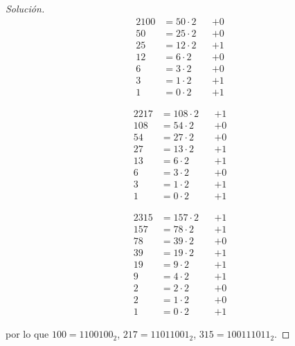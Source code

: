 \documentclass[spanish,mexico]{article}
\numberwithin{equation}{section}
\theoremstyle{definition}
\theoremstyle{remark}
\newenvironment{solution}{\begin{proof}[Solución]}{\end{proof}}
\begin{document}
\begin{enumerate}[wide]
\begin{solution}
    \begin{minipage}{.3\linewidth}
      \begin{alignat*}{2}
        100 &=50\cdot2&&+0\\
        50  &=25\cdot2&&+0\\
        25  &=12\cdot2&&+1\\
        12  &=6 \cdot2&&+0\\
        6   &=3 \cdot2&&+0\\
        3   &=1 \cdot2&&+1\\
        1   &=0 \cdot2&&+1
      \end{alignat*}
    \end{minipage}
    \begin{minipage}{.3\linewidth}
      \begin{alignat*}{2}
        217 &=108\cdot2&&+1\\
        108 &=54 \cdot2&&+0\\
        54  &=27 \cdot2&&+0\\
        27  &=13 \cdot2&&+1\\
        13  &=6  \cdot2&&+1\\
        6   &=3  \cdot2&&+0\\
        3   &=1  \cdot2&&+1\\
        1   &=0  \cdot2&&+1
      \end{alignat*}
    \end{minipage}
    \begin{minipage}{.3\linewidth}
      \begin{alignat*}{2}
        315 &=157 \cdot2&&+1\\
        157 &=78  \cdot2&&+1\\
        78  &=39  \cdot2&&+0\\
        39  &=19  \cdot2&&+1\\
        19  &=9   \cdot2&&+1\\
        9   &=4   \cdot2&&+1\\
        2   &=2   \cdot2&&+0\\
        2   &=1   \cdot2&&+0\\
        1   &=0   \cdot2&&+1
      \end{alignat*}
    \end{minipage}
    
    por lo que $100=1100100_2$, $217=11011001_2$, $315=100111011_2$.
    

\end{solution}
\end{enumerate}
\end{document}
